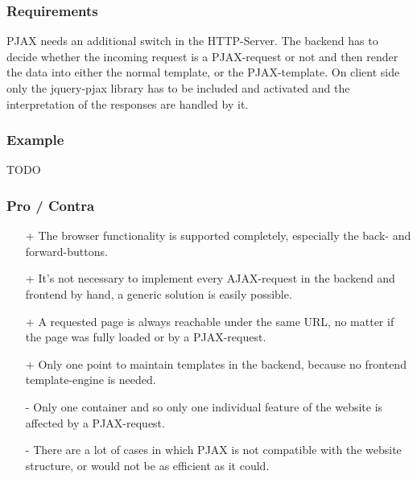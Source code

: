 \documentclass[f,bachelor,binding,twoside,palatino]{WeSTthesis}
\def \ajax {AJAX}
\def \pjax {PJAX}
\def \pjaxRequest {PJAX-request}
\begin{document}
    \subsubsection{Requirements}
    \pjax{} needs an additional switch in the HTTP-Server. The backend has to decide whether the incoming request is a \pjaxRequest{} or not and then render the data into either the normal template, or the \pjax{}-template. On client side only the jquery-pjax library has to be included and activated and the interpretation of the responses are handled by it.

    \subsubsection{Example}
    TODO

    \subsubsection{Pro / Contra}
      \begin{itemize}
  	    \item[+]{The browser functionality is supported completely, especially the back- and forward-buttons.}
  	    \item[+]{It's not necessary to implement every \ajax{}-request in the backend and frontend by hand, a generic solution is easily possible.}
  	    \item[+]{A requested page is always reachable under the same URL, no matter if the page was fully loaded or by a \pjaxRequest{}.}
  	    \item[+]{Only one point to maintain templates in the backend, because no frontend template-engine is needed.}
  	    \item[-]{Only one container and so only one individual feature of the website is affected by a \pjaxRequest{}.}
  	    \item[-]{There are a lot of cases in which \pjax{} is not compatible with the website structure, or would not be as efficient as it could.}
      \end{itemize}
\end{document}
